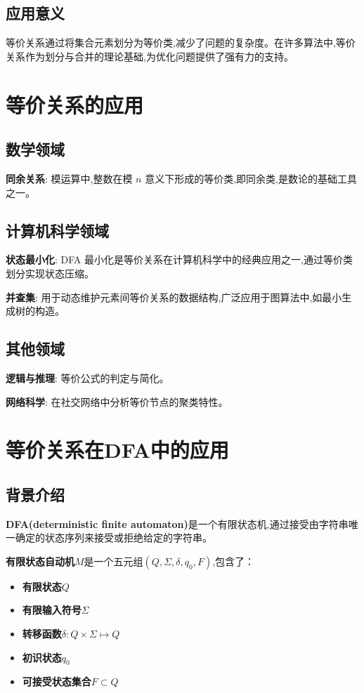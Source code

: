 \documentclass[UTF8]{ctexart}
\begin{document}
	\subsection{应用意义}
	\large 等价关系通过将集合元素划分为等价类,减少了问题的复杂度。在许多算法中,等价关系作为划分与合并的理论基础,为优化问题提供了强有力的支持。
	
	
	\newpage
	\section{等价关系的应用}
	\subsection{数学领域}
	\large \textbf{同余关系}: 模运算中,整数在模 $n$ 意义下形成的等价类,即同余类,是数论的基础工具之一。
	
	\subsection{计算机科学领域}
	\large \textbf{状态最小化}: DFA 最小化是等价关系在计算机科学中的经典应用之一,通过等价类划分实现状态压缩。
	
	\large \textbf{并查集}: 用于动态维护元素间等价关系的数据结构,广泛应用于图算法中,如最小生成树的构造。
	
	\subsection{其他领域}
	\large \textbf{逻辑与推理}: 等价公式的判定与简化。
	
	\large \textbf{网络科学}: 在社交网络中分析等价节点的聚类特性。
	
	
	\newpage
	\section{等价关系在DFA中的应用}
	\subsection{背景介绍}
	\textbf{DFA(deterministic finite automaton)}是一个有限状态机,通过接受由字符串唯一确定的状态序列来接受或拒绝给定的字符串。
	
	\textbf{有限状态自动机}$M$是一个五元组$(Q, \Sigma, \delta, q_0, F)$,包含了： 
	\begin{itemize}
		\item \textbf{有限状态$Q$}
		\item \textbf{有限输入符号$\Sigma$}
		\item \textbf{转移函数$\delta: Q \times \Sigma \mapsto Q$}
		\item \textbf{初识状态$q_0$}
		\item \textbf{可接受状态集合$F \subset Q$}
	\end{itemize}
	
\end{document}
